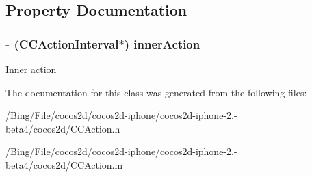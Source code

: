 \subsection{Property Documentation}
\hypertarget{interface_c_c_repeat_forever_a33ab7f675a5d722f903386ab2279ccd1}{
\subsubsection[{inner\-Action}]{\setlength{\rightskip}{0pt plus 5cm}-\/ ({\bf C\-C\-Action\-Interval}$\ast$) {\bf inner\-Action}}}\label{interface_c_c_repeat_forever_a33ab7f675a5d722f903386ab2279ccd1}
Inner action 

The documentation for this class was generated from the following files\-:\begin{DoxyCompactItemize}
\item 
/\-Bing/\-File/cocos2d/cocos2d-\/iphone/cocos2d-\/iphone-\/2.-\/beta4/cocos2d/C\-C\-Action.\-h\item 
/\-Bing/\-File/cocos2d/cocos2d-\/iphone/cocos2d-\/iphone-\/2.-\/beta4/cocos2d/C\-C\-Action.\-m\end{DoxyCompactItemize}
